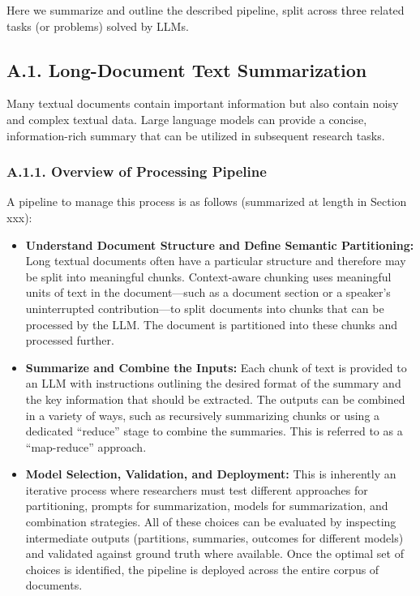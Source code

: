 \documentclass[11pt]{article}
\begin{document}
Here we summarize and outline the described pipeline, split across three related tasks (or problems) solved by LLMs.

\subsection*{A.1. Long-Document Text Summarization}

Many textual documents contain important information but also contain noisy and complex textual data. Large language models can provide a concise, information-rich summary that can be utilized in subsequent research tasks.

\subsubsection*{A.1.1. Overview of Processing Pipeline}

A pipeline to manage this process is as follows (summarized at length in Section xxx):

\begin{itemize}
    \item \textbf{Understand Document Structure and Define Semantic Partitioning:} Long textual documents often have a particular structure and therefore may be split into meaningful chunks. Context-aware chunking uses meaningful units of text in the document---such as a document section or a speaker's uninterrupted contribution---to split documents into chunks that can be processed by the LLM. The document is partitioned into these chunks and processed further.
    \item \textbf{Summarize and Combine the Inputs:} Each chunk of text is provided to an LLM with instructions outlining the desired format of the summary and the key information that should be extracted. The outputs can be combined in a variety of ways, such as recursively summarizing chunks or using a dedicated ``reduce'' stage to combine the summaries. This is referred to as a ``map-reduce'' approach.
    \item \textbf{Model Selection, Validation, and Deployment:} This is inherently an iterative process where researchers must test different approaches for partitioning, prompts for summarization, models for summarization, and combination strategies. All of these choices can be evaluated by inspecting intermediate outputs (partitions, summaries, outcomes for different models) and validated against ground truth where available. Once the optimal set of choices is identified, the pipeline is deployed across the entire corpus of documents.
\end{itemize}
\end{document}
